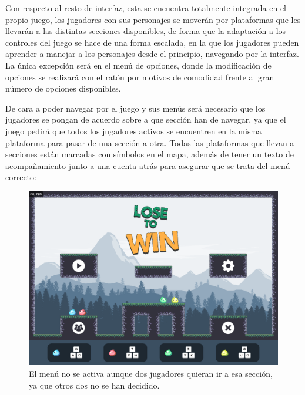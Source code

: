 \documentclass[12pt, spanish]{article}
\begin{document}
Con respecto al resto de interfaz, esta se encuentra totalmente integrada en el propio juego, los jugadores con sus personajes se moverán por plataformas que les llevarán a las distintas secciones disponibles, de forma que la adaptación a los controles del juego se hace de una forma escalada, en la que los jugadores pueden aprender a manejar a los personajes desde el principio, navegando por la interfaz. La única excepción será en el menú de opciones, donde la modificación de opciones se realizará con el ratón por motivos de comodidad frente al gran número de opciones disponibles.

De cara a poder navegar por el juego y sus menús será necesario que los jugadores se pongan de acuerdo sobre a que sección han de navegar, ya que el juego pedirá que todos los jugadores activos se encuentren en la misma plataforma para pasar de una sección a otra. Todas las plataformas que llevan a secciones están marcadas con símbolos en el mapa, además de tener un texto de acompañamiento junto a una cuenta atrás para asegurar que se trata del menú correcto:

\begin{figure}[H]
  \centering
	\includegraphics[width=\textwidth]{"interfaz/menu_no_funciona_num_jugadores.png"}
  \caption{El menú no se activa aunque dos jugadores quieran ir a esa sección, ya que otros dos no se han decidido.}\label{figure:menu_no_funciona_num_jugadores}
\end{figure}
\end{document}
